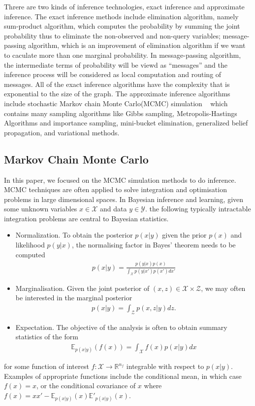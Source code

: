 Threre are two kinds of inference technologies, exact inference and approximate inference. The exact inference methods include elimination algorithm, namely sum-product algorithm, which computes the probability by summing the joint probability thus to eliminate the non-observed and non-query variables; message-passing algorithm, which is an improvement of elimination algorithm if we want to caculate more than one marginal probability. In message-passing algorithm, the intermediate terms of probability will be viewd as ``messages'' and the inference process will be considered as local computation and routing of messages. All of the exact inference algorithms have the complexity that is exponential to the size of the graph. The approximate inference algorithms include stochastic Markov chain Monte Carlo(MCMC) simulation ~\cite{mcmc} which contains many sampling algorithms like Gibbs sampling, Metropolis-Hastings Algorithms and importance sampling, mini-bucket elimination, generalized belief propagation, and variational methods.

\subsection{Markov Chain Monte Carlo}
In this paper, we focused on the MCMC simulation methods to do inference. MCMC techniques are often applied to solve integration and optimisation problems in large dimensional spaces. In Bayesian inference and learning, given some unknown variables $x \in \mathscr{X}$ and data $y \in \mathscr{Y}$. the following typically intractable integration problems are central to Bayesian statistics. 
\begin{itemize}
  \item Normalization. To obtain the posterior $p(x | y)$ given the prior $p(x)$ and likelihood $p(y | x)$, the normalising factor in Bayes' theorem needs to be computed
    \begin{align*}
      p(x | y) = \frac{p(y | x)p(x)}{\int_{\mathscr{X}} p(y | x')p(x')dx'}
    \end{align*}
  \item Marginalisation. Given the joint posterior of $(x, z) \in \mathscr{X} \times \mathscr{Z}$, we may often be interested in the marginal posterior
    \begin{align*}
      p(x | y) = \int_{\mathscr{Z}} p(x, z| y)dz.
    \end{align*}
  \item Expectation. The objective of the analysis is often to obtain summary statistics of the form 
    \begin{align*}
      \mathbb{E}_{p(x|y)}(f(x)) = \int_{\mathscr{X}}f(x)p(x | y)dx
    \end{align*}
\end{itemize}
for some function of interest $f : \mathscr{X} \rightarrow \mathbb{R}^{n_f}$ integrable with respect to $p(x | y)$. Examples of appropriate functions include the conditional mean, in which case $f(x) = x$, or the conditional covariance of $x$ where $f(x) = xx' - \mathbb{E}_{p(x|y)}(x)\mathbb{E}'_{p(x|y)}(x)$.

